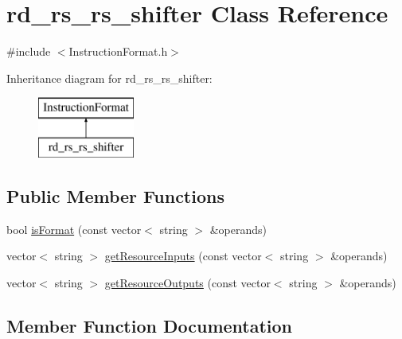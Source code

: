 \hypertarget{classrd__rs__rs__shifter}{}\section{rd\+\_\+rs\+\_\+rs\+\_\+shifter Class Reference}
\label{classrd__rs__rs__shifter}


{\ttfamily \#include $<$Instruction\+Format.\+h$>$}

Inheritance diagram for rd\+\_\+rs\+\_\+rs\+\_\+shifter\+:\begin{figure}[H]
\begin{center}
\leavevmode
\includegraphics[height=2.000000cm]{classrd__rs__rs__shifter}
\end{center}
\end{figure}
\subsection*{Public Member Functions}
\begin{DoxyCompactItemize}
\item 
bool \hyperlink{classrd__rs__rs__shifter_aa60a168e3fb236635bab054c85a8ef0e}{is\+Format} (const vector$<$ string $>$ \&operands)
\item 
vector$<$ string $>$ \hyperlink{classrd__rs__rs__shifter_a6702691c38b2f3739d3c6f754f51411e}{get\+Resource\+Inputs} (const vector$<$ string $>$ \&operands)
\item 
vector$<$ string $>$ \hyperlink{classrd__rs__rs__shifter_a4ec7aa9c844e62d408c8846406d854ec}{get\+Resource\+Outputs} (const vector$<$ string $>$ \&operands)
\end{DoxyCompactItemize}


\subsection{Member Function Documentation}
\mbox{\label{classrd__rs__rs__shifter_a6702691c38b2f3739d3c6f754f51411e}} 
